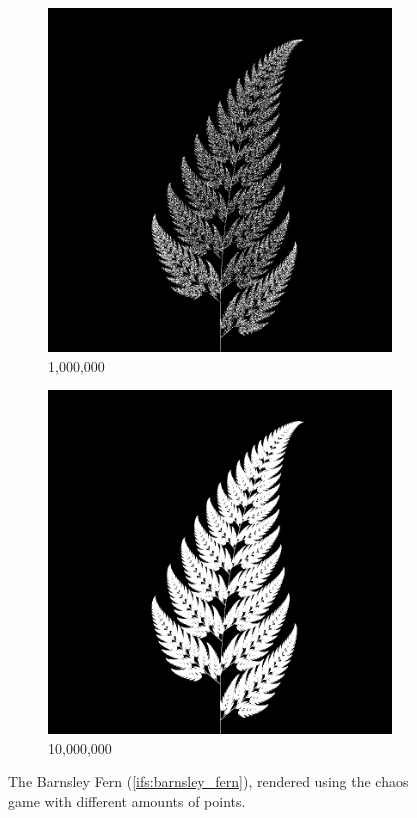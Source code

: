 \documentclass[11pt]{article}
\begin{document}
\begin{figure}
     \centering
     \begin{subfigure}[b]{0.4\textwidth}
         \centering
         \includegraphics[width=\textwidth]{figures/barnsley_1000000}
         \caption{1,000,000}
         \label{figure:barnsley_mil}
     \end{subfigure}
     \hfill
     \begin{subfigure}[b]{0.4\textwidth}
         \centering
         \includegraphics[width=\textwidth]{figures/barnsley_100000000}
         \caption{10,000,000}
         \label{figure:barnsley_ten_mil}
     \end{subfigure}
        \caption{The Barnsley Fern (\autoref{ifs:barnsley_fern}), rendered using the chaos game with different amounts of points.}
        \label{figure:barnsley_chaos_game_points}
\end{figure}
\end{document}
